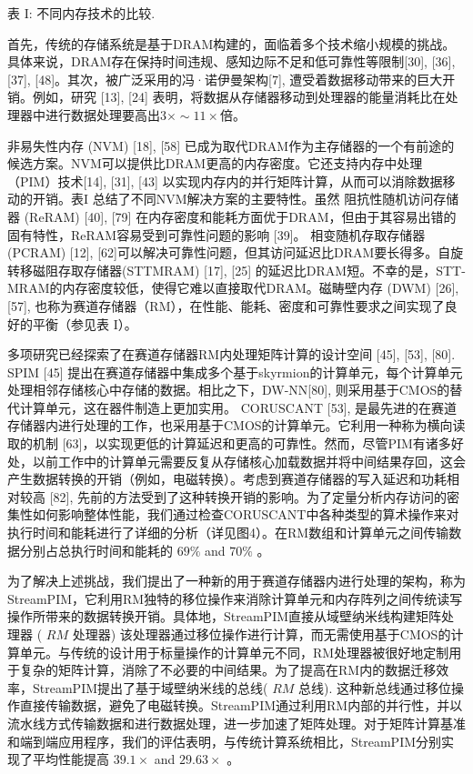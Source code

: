 \documentclass[10pt]{article}
\begin{document}
表 I: 不同内存技术的比较.


首先，传统的存储系统是基于DRAM构建的，面临着多个技术缩小规模的挑战。具体来说，DRAM存在保持时间违规、感知边际不足和低可靠性等限制[30], [36], [37], [48]。其次，被广泛采用的冯·诺伊曼架构[7], 遭受着数据移动带来的巨大开销。例如，研究 [13], [24] 表明，将数据从存储器移动到处理器的能量消耗比在处理器中进行数据处理要高出$3 \times \sim 11 \times$倍。

非易失性内存 (NVM) [18], [58] 已成为取代DRAM作为主存储器的一个有前途的候选方案。NVM可以提供比DRAM更高的内存密度。它还支持内存中处理（PIM）技术[14], [31], [43] 以实现内存内的并行矩阵计算，从而可以消除数据移动的开销。表I  总结了不同NVM解决方案的主要特性。虽然 阻抗性随机访问存储器 (ReRAM) [40], [79] 在内存密度和能耗方面优于DRAM，但由于其容易出错的固有特性，ReRAM容易受到可靠性问题的影响 [39]。 相变随机存取存储器(PCRAM) [12], [62]可以解决可靠性问题，但其访问延迟比DRAM要长得多。自旋转移磁阻存取存储器(STTMRAM) [17], [25] 的延迟比DRAM短。不幸的是，STT-MRAM的内存密度较低，使得它难以直接取代DRAM。磁畴壁内存 (DWM) [26], [57], 也称为赛道存储器（RM），在性能、能耗、密度和可靠性要求之间实现了良好的平衡（参见表 I）。

多项研究已经探索了在赛道存储器RM内处理矩阵计算的设计空间 [45], [53], [80]. SPIM [45] 提出在赛道存储器中集成多个基于skyrmion的计算单元，每个计算单元处理相邻存储核心中存储的数据。相比之下，DW-NN[80], 则采用基于CMOS的替代计算单元，这在器件制造上更加实用。 CORUSCANT [53], 是最先进的在赛道存储器内进行处理的工作，也采用基于CMOS的计算单元。它利用一种称为横向读取的机制 [63]，以实现更低的计算延迟和更高的可靠性。然而，尽管PIM有诸多好处，以前工作中的计算单元需要反复从存储核心加载数据并将中间结果存回，这会产生数据转换的开销（例如，电磁转换）。考虑到赛道存储器的写入延迟和功耗相对较高 [82], 先前的方法受到了这种转换开销的影响。为了定量分析内存访问的密集性如何影响整体性能，我们通过检查CORUSCANT中各种类型的算术操作来对执行时间和能耗进行了详细的分析（详见图4）。在RM数组和计算单元之间传输数据分别占总执行时间和能耗的 $69 \%$ and $70 \%$ 。


为了解决上述挑战，我们提出了一种新的用于赛道存储器内进行处理的架构，称为StreamPIM，它利用RM独特的移位操作来消除计算单元和内存阵列之间传统读写操作所带来的数据转换开销。具体地，StreamPIM直接从域壁纳米线构建矩阵处理器 ( $R M$ 处理器) 该处理器通过移位操作进行计算，而无需使用基于CMOS的计算单元。与传统的设计用于标量操作的计算单元不同，RM处理器被很好地定制用于复杂的矩阵计算，消除了不必要的中间结果。为了提高在RM内的数据迁移效率，StreamPIM提出了基于域壁纳米线的总线( $R M$ 总线). 这种新总线通过移位操作直接传输数据，避免了电磁转换。StreamPIM通过利用RM内部的并行性，并以流水线方式传输数据和进行数据处理，进一步加速了矩阵处理。对于矩阵计算基准和端到端应用程序，我们的评估表明，与传统计算系统相比，StreamPIM分别实现了平均性能提高 $39.1 \times$ and $29.63 \times$ 。
\end{document}
